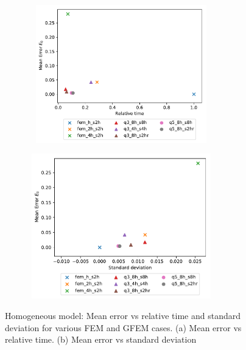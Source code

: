  \begin{figure}[h!]

		\begin{subfigure}{8cm}
				\includegraphics[width=8cm, height=6cm]{Thesis_Edith/figures/homo/homo_waves/MeanError_time_radial.pdf}
			   \caption{}
	    \hspace{0.25cm}	
		\end{subfigure}
				\begin{subfigure}{8cm}
				\includegraphics[width=8cm, height=6.3cm]{Thesis_Edith/figures/homo/homo_waves/Error_std_radial.pdf}
				\caption{}
		\end{subfigure}
 
	\caption{Homogeneous model: Mean error vs relative time and standard deviation for various FEM and GFEM cases. (a) Mean error vs relative time. (b) Mean error vs standard deviation}
	\label{fig:3.13}
\end{figure}

